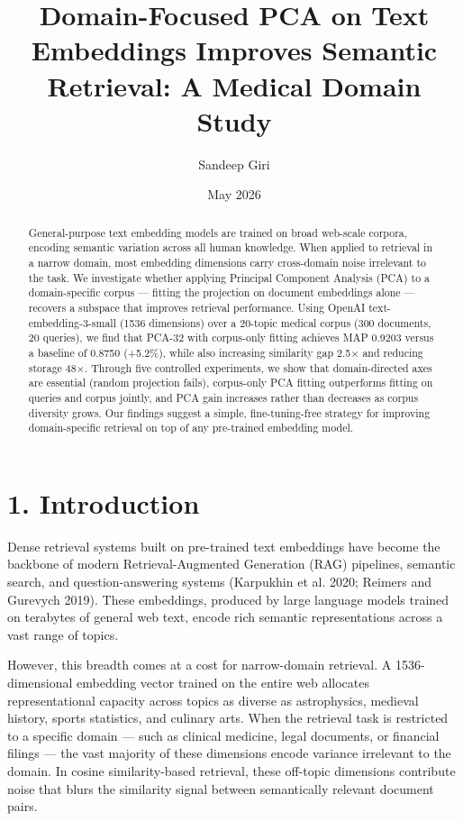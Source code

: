 \documentclass[
  11pt,
  letterpaper,
]{article}
\title{Domain-Focused PCA on Text Embeddings Improves Semantic
Retrieval: A Medical Domain Study}
\author{Sandeep Giri}
\date{May 2026}
\begin{document}
\maketitle
\begin{abstract}
General-purpose text embedding models are trained on broad web-scale
corpora, encoding semantic variation across all human knowledge. When
applied to retrieval in a narrow domain, most embedding dimensions carry
cross-domain noise irrelevant to the task. We investigate whether
applying Principal Component Analysis (PCA) to a domain-specific corpus
--- fitting the projection on document embeddings alone --- recovers a
subspace that improves retrieval performance. Using OpenAI
text-embedding-3-small (1536 dimensions) over a 20-topic medical corpus
(300 documents, 20 queries), we find that PCA-32 with corpus-only
fitting achieves MAP 0.9203 versus a baseline of 0.8750 (+5.2\%), while
also increasing similarity gap 2.5× and reducing storage 48×. Through
five controlled experiments, we show that domain-directed axes are
essential (random projection fails), corpus-only PCA fitting outperforms
fitting on queries and corpus jointly, and PCA gain increases rather
than decreases as corpus diversity grows. Our findings suggest a simple,
fine-tuning-free strategy for improving domain-specific retrieval on top
of any pre-trained embedding model.
\end{abstract}

\section{1. Introduction}\label{introduction}

Dense retrieval systems built on pre-trained text embeddings have become
the backbone of modern Retrieval-Augmented Generation (RAG) pipelines,
semantic search, and question-answering systems (Karpukhin et al. 2020;
Reimers and Gurevych 2019). These embeddings, produced by large language
models trained on terabytes of general web text, encode rich semantic
representations across a vast range of topics.

However, this breadth comes at a cost for narrow-domain retrieval. A
1536-dimensional embedding vector trained on the entire web allocates
representational capacity across topics as diverse as astrophysics,
medieval history, sports statistics, and culinary arts. When the
retrieval task is restricted to a specific domain --- such as clinical
medicine, legal documents, or financial filings --- the vast majority of
these dimensions encode variance irrelevant to the domain. In cosine
similarity-based retrieval, these off-topic dimensions contribute noise
that blurs the similarity signal between semantically relevant document
pairs.
\end{document}
